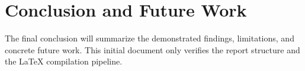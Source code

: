 \section{Conclusion and Future Work}
\label{sec:conclusion}
The final conclusion will summarize the demonstrated findings,
limitations, and concrete future work. This initial document only verifies
the report structure and the LaTeX compilation pipeline.
